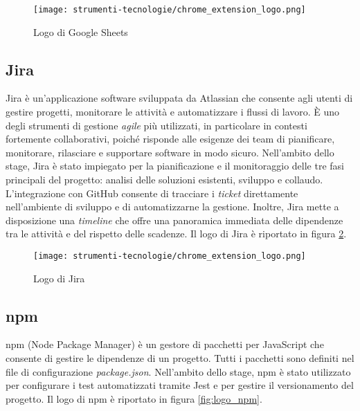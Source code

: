 \begin{figure}[H]
  \centering 
  \texttt{[image: strumenti-tecnologie/chrome\_extension\_logo.png]} 
  \caption{Logo di Google Sheets}
  \label{fig:logo_google_sheets}
\end{figure}

\subsection*{Jira}

\par Jira è un'applicazione software sviluppata da Atlassian che consente agli utenti di gestire progetti, monitorare le attività e automatizzare i flussi di lavoro. È uno degli strumenti di gestione \textit{agile} più utilizzati, in particolare in contesti fortemente collaborativi, poiché risponde alle esigenze dei team di pianificare, monitorare, rilasciare e supportare software in modo sicuro. Nell’ambito dello stage, Jira è stato impiegato per la pianificazione e il monitoraggio delle tre fasi principali del progetto: analisi delle soluzioni esistenti, sviluppo e collaudo. L’integrazione con GitHub consente di tracciare i \textit{ticket} direttamente nell’ambiente di sviluppo e di automatizzarne la gestione. Inoltre, Jira mette a disposizione una \textit{timeline} che offre una panoramica immediata delle dipendenze tra le attività e del rispetto delle scadenze. Il logo di Jira è riportato in figura \ref{fig:logo_jira}.

\begin{figure}[H]
  \centering 
  \texttt{[image: strumenti-tecnologie/chrome\_extension\_logo.png]} 
  \caption{Logo di Jira}
  \label{fig:logo_jira}
\end{figure}

\subsection*{npm}

\par npm (Node Package Manager) è un gestore di pacchetti per JavaScript che consente di gestire le dipendenze di un progetto. Tutti i pacchetti sono definiti nel file di configurazione \textit{package.json}. Nell’ambito dello stage, npm è stato utilizzato per configurare i test automatizzati tramite Jest e per gestire il versionamento del progetto. Il logo di npm è riportato in figura \ref{fig:logo_npm}.


